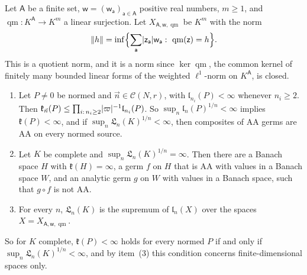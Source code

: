 Let $\mathsf A$ be a finite set, $\mathsf w=(\mathsf w_{\mathsf a})_{\mathsf a\in\mathsf A}$ positive real numbers, $m\ge1$, and $\operatorname{qm}\colon K^{\mathsf A}\to K^m$ a linear surjection. Let $X_{\mathsf A,\mathsf w,\operatorname{qm}}$ be $K^m$ with the norm
\[
 \lVert h\rVert=\inf\Bigl\{\sum_{\mathsf a}\lvert \mathsf z_{\mathsf a}\rvert\mathsf w_{\mathsf a}:\ \operatorname{qm}(\mathsf z)=h\Bigr\}.
\]
This is a quotient norm, and it is a norm since $\ker\operatorname{qm}$, the common kernel of finitely many bounded linear forms of the weighted $\ell^1$-norm on $K^{\mathsf A}$, is closed.

\begin{proposition}\label{dp:prop:all-sources}
\leavevmode
\begin{enumerate}
\item Let $P\ne0$ be normed and $\vec n\in\mathcal C(N,r)$, with $\mathfrak l_{n_i}(P)<\infty$ whenever $n_i\ge2$. Then $\mathfrak k_{\vec n}(P)\le\prod_{i:\,n_i\ge2}\lvert \varpi\rvert^{-1}\mathfrak l_{n_i}(P)$. So $\sup_n\mathfrak l_n(P)^{1/n}<\infty$ implies $\mathfrak k(P)<\infty$, and if $\sup_n\mathfrak L_n(K)^{1/n}<\infty$, then composites of AA germs are AA on every normed source.
\item Let $K$ be complete and $\sup_n\mathfrak L_n(K)^{1/n}=\infty$. Then there are a Banach space $H$ with $\mathfrak k(H)=\infty$, a germ $f$ on $H$ that is AA with values in a Banach space $W$, and an analytic germ $g$ on $W$ with values in a Banach space, such that $g\circ f$ is not AA.
\item For every $n$, $\mathfrak L_n(K)$ is the supremum of $\mathfrak l_n(X)$ over the spaces $X=X_{\mathsf A,\mathsf w,\operatorname{qm}}$.
\end{enumerate}
\end{proposition}

So for $K$ complete, $\mathfrak k(P)<\infty$ holds for every normed $P$ if and only if $\sup_n\mathfrak L_n(K)^{1/n}<\infty$, and by item~(3) this condition concerns finite-dimensional spaces only.

